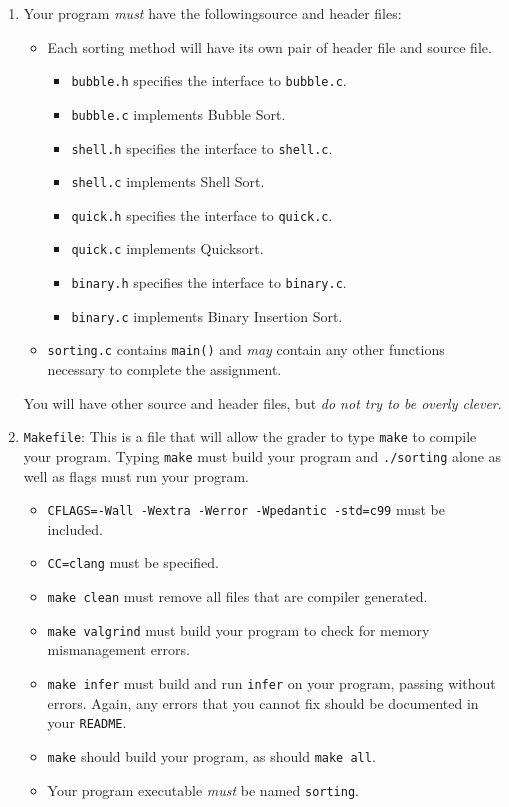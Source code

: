 \documentclass[11pt]{article}
\begin{document}
\begin{enumerate}
\item Your program \emph{must} have the followingsource and header files:
\begin{itemize}
\item Each sorting method will have its own pair of header file and source file.
\begin{itemize}
\item \texttt{bubble.h} specifies the interface to \texttt{bubble.c}.
\item \texttt{bubble.c} implements Bubble Sort.
\item \texttt{shell.h} specifies the interface to \texttt{shell.c}.
\item \texttt{shell.c} implements Shell Sort.
\item \texttt{quick.h} specifies the interface to \texttt{quick.c}.
\item \texttt{quick.c} implements Quicksort.
\item \texttt{binary.h} specifies the interface to \texttt{binary.c}.
\item \texttt{binary.c} implements Binary Insertion Sort.
\end{itemize}

\item \texttt{sorting.c} contains \texttt{main()} and \emph{may} contain any other functions necessary to complete the assignment.
\end{itemize}
You will have other source and header files, but \emph{do not try to be overly clever}.

\item \texttt{Makefile}: This is a file that will allow the grader
to type \texttt{make} to compile your program. Typing \texttt{make} must build your program and \texttt{./sorting} alone as well as flags must run your program.
  \begin{itemize}
  \item \texttt{CFLAGS=-Wall -Wextra -Werror -Wpedantic -std=c99} must be included.
  \item \texttt{CC=clang} must be specified.
  \item \texttt{make clean} must remove all files that are compiler generated.
  \item \texttt{make valgrind} must build your program to check for memory mismanagement errors.
  \item \texttt{make infer} must build and run \texttt{infer} on your program, passing without errors. Again, any errors that you cannot fix should be documented in your \texttt{README}.
  \item \texttt{make} should build your program, as should \texttt{make all}.
  \item Your program executable \emph{must} be named \texttt{sorting}.


\end{itemize}
\end{enumerate}
\end{document}
